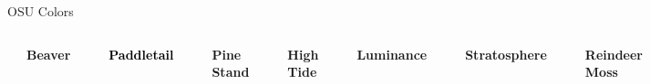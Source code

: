 \documentclass[10pt, xcolor={table}]{beamer}
\begin{document}
\newcommand{\legendbox}[1]{%
  \textcolor{#1}{\rule{\fontcharht\font`X}{\fontcharht\font`X}}%
}

\begin{frame}{OSU Colors}

    \begin{columns}[]
    \column{3cm}
        \legendbox{beaver} \quad \textbf{\textcolor{beaver}{Beaver}} \\ \bigskip
        \legendbox{black} \quad \textbf{\textcolor{black}{Paddletail}} \\ \bigskip
        \legendbox{pinestand} \quad \textbf{\textcolor{pinestand}{Pine Stand}} \\\bigskip
        \legendbox{hightide} \quad \textbf{\textcolor{hightide}{High Tide}} \\\bigskip
        \legendbox{luminance} \quad \textbf{\textcolor{luminance}{Luminance}} \\ \bigskip
        \legendbox{stratosphere} \quad \textbf{\textcolor{stratosphere}{Stratosphere}} \\ \bigskip        
    \column{3cm}
        \legendbox{reindeermoss} \quad \textbf{\textcolor{reindeermoss}{Reindeer Moss}} \\ \bigskip
        \legendbox{seafoam} \quad \textbf{\textcolor{seafoam}{Seafoam}} \\ \bigskip
        \legendbox{candela} \quad \textbf{\textcolor{candela}{Candela}} \\ \bigskip
        \legendbox{moondust} \quad \textbf{\textcolor{moondust}{Moondust}} \\ \bigskip
        \legendbox{hopbine} \quad \textbf{\textcolor{hopbine}{Hop Bine}} \\ \bigskip
        \legendbox{roguewave} \quad \textbf{\textcolor{roguewave}{Rogue Wave}} \\ \bigskip
    \column{3cm}
        
        \legendbox{solarflare} \quad \textbf{\textcolor{solarflare}{Solar Flare}} \\ \bigskip
        \legendbox{starcanvas} \quad \textbf{\textcolor{starcanvas}{Star Canvas}} \\ \bigskip
        \legendbox{till} \quad \textbf{\textcolor{till}{Till}} \\ \bigskip
        \legendbox{coastline} \quad \textbf{\textcolor{coastline}{Coastline}} \\ \bigskip
        \legendbox{highdesert} \quad \textbf{\textcolor{highdesert}{High Desert}} \\ \bigskip
        \legendbox{crater} \quad \textbf{\textcolor{crater}{Crater}} \\ \bigskip
    \end{columns}	
\end{frame}
\end{document}
